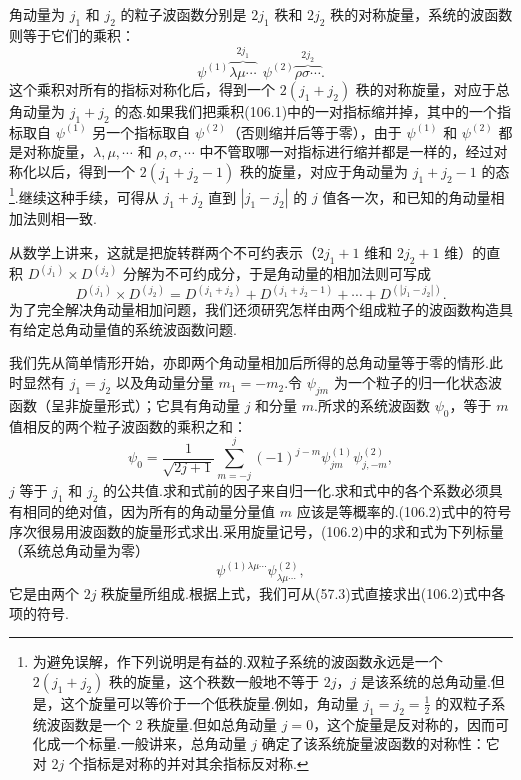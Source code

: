角动量为 $j_1$ 和 $j_2$ 的粒子波函数分别是 $2j_1$ 秩和 $2j_2$ 秩的对称旋量，系统的波函数则等于它们的乘积：
\begin{equation}
  \psi^{(1)}\overbrace{\lambda\mu\cdots}^{2j_1}\ \
  \psi^{(2)}\overbrace{\rho\sigma\cdots}^{2j_2}.
\end{equation}
这个乘积对所有的指标对称化后，得到一个 $2(j_1+j_2)$ 秩的对称旋量，对应于总角动量为 $j_1+j_2$ 的态.如果我们把乘积(106.1)中的一对指标缩并掉，其中的一个指标取自 $\psi^{(1)}$ 另一个指标取自 $\psi^{(2)}$（否则缩并后等于零），由于 $\psi^{(1)}$ 和 $\psi^{(2)}$ 都是对称旋量，$\lambda,\mu,\cdots$ 和 $\rho,\sigma,\cdots$ 中不管取哪一对指标进行缩并都是一样的，经过对称化以后，得到一个 $2(j_1+j_2-1)$ 秩的旋量，对应于角动量为 $j_1+j_2-1$ 的态\footnote{为避免误解，作下列说明是有益的.双粒子系统的波函数永远是一个 $2(j_1+j_2)$ 秩的旋量，这个秩数一般地不等于 $2j$，$j$ 是该系统的总角动量.但是，这个旋量可以等价于一个低秩旋量.例如，角动量 $j_1=j_2=\frac{1}{2}$ 的双粒子系统波函数是一个 2 秩旋量.但如总角动量 $j=0$，这个旋量是反对称的，因而可化成一个标量.一般讲来，总角动量 $j$ 确定了该系统旋量波函数的对称性：它对 $2j$ 个指标是对称的并对其余指标反对称.}.继续这种手续，可得从 $j_1+j_2$ 直到 $|j_1-j_2|$ 的 $j$ 值各一次，和已知的角动量相加法则相一致.

从数学上讲来，这就是把旋转群两个不可约表示（$2j_1+1$ 维和 $2j_2+1$ 维）的直积 $D^{(j_1)}\times D^{(j_2)}$ 分解为不可约成分，于是角动量的相加法则可写成
\begin{equation*}
  D^{(j_1)}\times D^{(j_2)}
  =D^{(j_1+j_2)}+D^{(j_1+j_2-1)}+\cdots+D^{(|j_1-j_2|)}.
\end{equation*}
为了完全解决角动量相加问题，我们还须研究怎样由两个组成粒子的波函数构造具有给定总角动量值的系统波函数问题.

我们先从简单情形开始，亦即两个角动量相加后所得的总角动量等于零的情形.此时显然有 $j_1=j_2$ 以及角动量分量 $m_1=-m_2$.令 $\psi_{jm}$ 为一个粒子的归一化状态波函数（呈非旋量形式）；它具有角动量 $j$ 和分量 $m$.所求的系统波函数 $\psi_0$，等于 $m$ 值相反的两个粒子波函数的乘积之和：
\begin{equation}
  \psi_0=\frac{1}{\sqrt{2j+1}}\sum_{m=-j}^{j}(-1)^{j-m}
  \psi^{(1)}_{jm}\psi^{(2)}_{j,-m},
\end{equation}
$j$ 等于 $j_1$ 和 $j_2$ 的公共值.求和式前的因子来自归一化.求和式中的各个系数必须具有相同的绝对值，因为所有的角动量分量值 $m$ 应该是等概率的.(106.2)式中的符号序次很易用波函数的旋量形式求出.采用旋量记号，(106.2)中的求和式为下列标量（系统总角动量为零）
\begin{equation}
  \psi^{(1)\lambda\mu\cdots}\psi^{(2)}_{\lambda\mu\cdots},
\end{equation}
它是由两个 $2j$ 秩旋量所组成.根据上式，我们可从(57.3)式直接求出(106.2)式中各项的符号.

